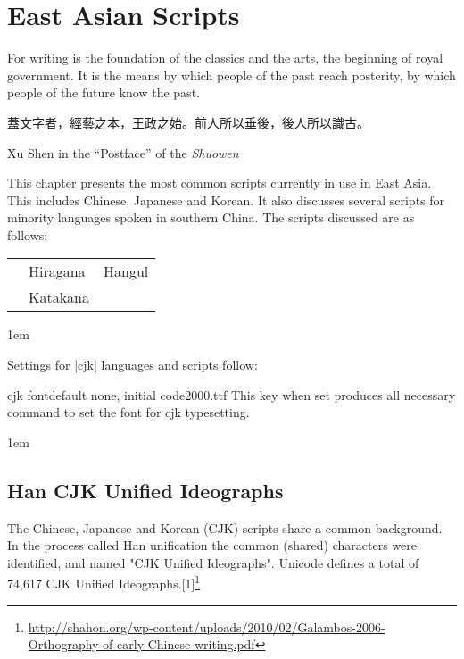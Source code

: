 \pagestyle{headings}
\chapter{East Asian Scripts}
\epigraph{

For writing is the foundation of the classics and the arts, the beginning of
royal government. It is the means by which people of the past reach posterity,
by which people of the future know the past. 

{\cjk 蓋文字者，經藝之本，王政之始。前人所以垂後，後人所以識古。}
}{ Xu Shen  in the ``Postface'' of the \emph{Shuowen}}

\bigskip

\noindent This chapter presents the most common scripts currently in use in East Asia. This includes Chinese, Japanese and Korean. It also discusses several scripts for minority languages spoken in southern China. The scripts discussed are as follows:


\begin{center}
\begin{tabular}{lll}
\nameref{s:han} &Hiragana &Hangul\\
\nameref{s:bopomofo} &Katakana &\nameref{s:yi}\\
\end{tabular}
\end{center}
\bigskip

\parindent1em

Settings for |cjk| languages and scripts follow:

\begin{docKey}[phd]{cjk font}{}{default none, initial code2000.ttf}
This key when set produces all necessary command to set the font for cjk typesetting.
\end{docKey}

\parindent1em
\section{Han CJK Unified Ideographs}
\label{s:han}
The Chinese, Japanese and Korean (CJK) scripts share a common background. In the process called Han unification the common (shared) characters were identified, and named "CJK Unified Ideographs". Unicode defines a total of 74,617 CJK Unified Ideographs.[1]\footnote{\protect\url{http://shahon.org/wp-content/uploads/2010/02/Galambos-2006-Orthography-of-early-Chinese-writing.pdf}}

